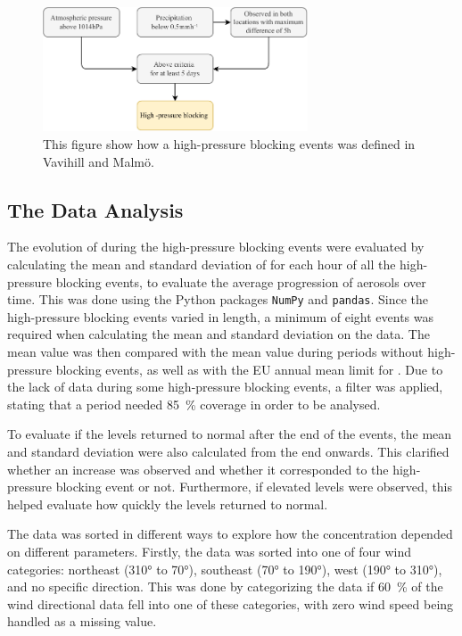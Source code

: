 \vspace{1cm}

\begin{figure}[H]
    \centering
    \includegraphics[width=0.7\textwidth]{Figures/Graph_BcThesis.pdf}
    \caption{This figure show how a high-pressure blocking events was defined in Vavihill and Malmö.}
    \label{fig:definiton}
\end{figure}

\newpage


\subsection{The Data Analysis}
The evolution of \PM during the high-pressure blocking events were evaluated by calculating the mean and standard deviation of \PM for each hour of all the high-pressure blocking events, to evaluate the average progression of aerosols over time. This was done using the Python packages \texttt{NumPy} and \texttt{pandas}. Since the high-pressure blocking events varied in length, a minimum of eight events was required when calculating the mean and standard deviation on the \PM data. The mean \PM value was then compared with the mean \PM value during periods without high-pressure blocking events, as well as with the EU annual mean limit for \PM. Due to the lack of \PM data during some high-pressure blocking events, a filter was applied, stating that a period needed \SI{85}{\%} \PM coverage in order to be analysed.

To evaluate if the \PM levels returned to normal after the end of the events, the mean and standard deviation were also calculated from the end onwards. This clarified whether an increase was observed and whether it corresponded to the high-pressure blocking event or not. Furthermore, if elevated levels were observed, this helped evaluate how quickly the levels returned to normal.

The data was sorted in different ways to explore how the \PM concentration depended on different parameters. Firstly, the data was sorted into one of four wind categories: northeast (310° to 70°), southeast (70° to 190°), west (190° to 310°), and no specific direction. This was done by categorizing the data if \SI{60}{\%} of the wind directional data fell into one of these categories, with zero wind speed being handled as a missing value.


